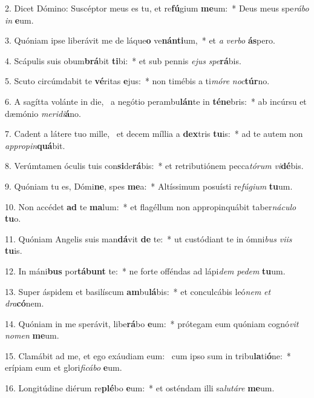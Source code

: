2. Dicet Dómino: Suscéptor meus es tu, et re\textbf{fú}gium \textbf{me}um:~*  Deus meus spe\textit{rá}\textit{bo} \textit{in} \textbf{e}um.\

3. Quóniam ipse liberávit me de láque\textbf{o} ve\textbf{nán}\textbf{ti}um,~*  et \textit{a} \textit{ver}\textit{bo} \textbf{ás}pero.\

4. Scápulis suis obum\textbf{brá}bit \textbf{ti}bi:~*  et sub pennis \textit{e}\textit{jus} \textit{spe}\textbf{rá}bis.\

5. Scuto circúmdabit te \textbf{vé}ritas \textbf{e}jus:~*  non timébis a ti\textit{mó}\textit{re} \textit{noc}\textbf{túr}no.\

6. A sagítta volánte in die, \dag\  a negótio perambu\textbf{lán}te in \textbf{té}\textbf{ne}bris:~*  ab incúrsu et dæmónio \textit{me}\textit{ri}\textit{di}\textbf{á}no.\

7. Cadent a látere tuo mille, \dag\  et decem míllia a \textbf{dex}tris \textbf{tu}is:~*  ad te autem non \textit{ap}\textit{pro}\textit{pin}\textbf{quá}bit.\

8. Verúmtamen óculis tuis con\textbf{si}de\textbf{rá}bis:~*  et retributiónem pecca\textit{tó}\textit{rum} \textit{vi}\textbf{dé}bis.\

9. Quóniam tu es, Dómi\textbf{ne}, spes \textbf{me}a:~*  Altíssimum posuísti re\textit{fú}\textit{gi}\textit{um} \textbf{tu}um.\

10. Non accédet \textbf{ad} te \textbf{ma}lum:~*  et flagéllum non appropinquábit taber\textit{ná}\textit{cu}\textit{lo} \textbf{tu}o.\

11. Quóniam Angelis suis man\textbf{dá}vit \textbf{de} te:~*  ut custódiant te in ómni\textit{bus} \textit{vi}\textit{is} \textbf{tu}is.\

12. In máni\textbf{bus} por\textbf{tá}\textbf{bunt} te:~*  ne forte offéndas ad lápi\textit{dem} \textit{pe}\textit{dem} \textbf{tu}um.\

13. Super áspidem et basilíscum \textbf{am}bu\textbf{lá}bis:~*  et conculcábis leó\textit{nem} \textit{et} \textit{dra}\textbf{có}nem.\

14. Quóniam in me sperávit, libe\textbf{rá}bo \textbf{e}um:~*  prótegam eum quóniam cognó\textit{vit} \textit{no}\textit{men} \textbf{me}um.\

15. Clamábit ad me, et ego exáudiam eum: \dag\  cum ipso sum in tribu\textbf{la}ti\textbf{ó}ne:~*  erípiam eum et glori\textit{fi}\textit{cá}\textit{bo} \textbf{e}um.\

16. Longitúdine diérum re\textbf{plé}bo \textbf{e}um:~*  et osténdam illi sa\textit{lu}\textit{tá}\textit{re} \textbf{me}um.\

